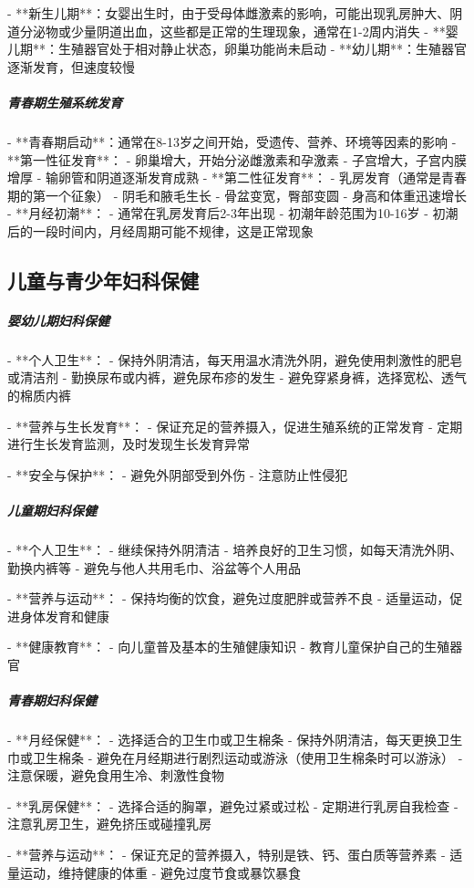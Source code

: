 \begin{enumerate}
- **新生儿期**：女婴出生时，由于受母体雌激素的影响，可能出现乳房肿大、阴道分泌物或少量阴道出血，这些都是正常的生理现象，通常在1-2周内消失
- **婴儿期**：生殖器官处于相对静止状态，卵巢功能尚未启动
- **幼儿期**：生殖器官逐渐发育，但速度较慢

\subparagraph{青春期生殖系统发育}

- **青春期启动**：通常在8-13岁之间开始，受遗传、营养、环境等因素的影响
- **第一性征发育**：
  - 卵巢增大，开始分泌雌激素和孕激素
  - 子宫增大，子宫内膜增厚
  - 输卵管和阴道逐渐发育成熟
- **第二性征发育**：
  - 乳房发育（通常是青春期的第一个征象）
  - 阴毛和腋毛生长
  - 骨盆变宽，臀部变圆
  - 身高和体重迅速增长
- **月经初潮**：
  - 通常在乳房发育后2-3年出现
  - 初潮年龄范围为10-16岁
  - 初潮后的一段时间内，月经周期可能不规律，这是正常现象

\subsection{儿童与青少年妇科保健}

\subparagraph{婴幼儿期妇科保健}

- **个人卫生**：
  - 保持外阴清洁，每天用温水清洗外阴，避免使用刺激性的肥皂或清洁剂
  - 勤换尿布或内裤，避免尿布疹的发生
  - 避免穿紧身裤，选择宽松、透气的棉质内裤

- **营养与生长发育**：
  - 保证充足的营养摄入，促进生殖系统的正常发育
  - 定期进行生长发育监测，及时发现生长发育异常

- **安全与保护**：
  - 避免外阴部受到外伤
  - 注意防止性侵犯

\subparagraph{儿童期妇科保健}

- **个人卫生**：
  - 继续保持外阴清洁
  - 培养良好的卫生习惯，如每天清洗外阴、勤换内裤等
  - 避免与他人共用毛巾、浴盆等个人用品

- **营养与运动**：
  - 保持均衡的饮食，避免过度肥胖或营养不良
  - 适量运动，促进身体发育和健康

- **健康教育**：
  - 向儿童普及基本的生殖健康知识
  - 教育儿童保护自己的生殖器官

\subparagraph{青春期妇科保健}

- **月经保健**：
  - 选择适合的卫生巾或卫生棉条
  - 保持外阴清洁，每天更换卫生巾或卫生棉条
  - 避免在月经期进行剧烈运动或游泳（使用卫生棉条时可以游泳）
  - 注意保暖，避免食用生冷、刺激性食物

- **乳房保健**：
  - 选择合适的胸罩，避免过紧或过松
  - 定期进行乳房自我检查
  - 注意乳房卫生，避免挤压或碰撞乳房

- **营养与运动**：
  - 保证充足的营养摄入，特别是铁、钙、蛋白质等营养素
  - 适量运动，维持健康的体重
  - 避免过度节食或暴饮暴食


\end{enumerate}
